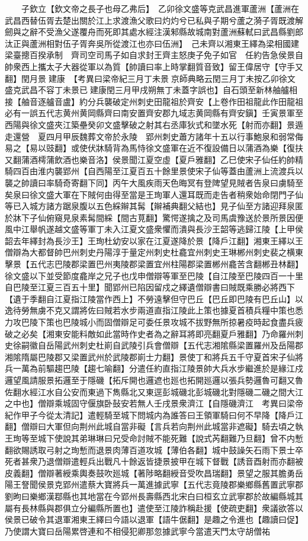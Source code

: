 　　子欽立【欽文帝之長子也母乙弗后】　乙卯徐文盛等克武昌進軍蘆洲【蘆洲在武昌西替伍胥去楚出關於江上求渡漁父歌曰灼灼兮已私與子期兮蘆之漪子胥既渡解劒與之辭不受漁父遂覆舟而死即其處水經注漢邾縣故城南對蘆洲蘇軾曰武昌縣劉郎汰正與蘆洲相對伍子胥奔吳所從渡江也亦曰伍洲】　己未齊以湘東王繹為梁相國建梁臺摠百揆承制　齊司空司馬子如自求封王齊主怒庚子免子如官　任約告急侯景自帥衆西上攜太子大器從軍以為質【帥讀曰率上時掌翻質音致】留王偉居守【守手又翻】閏月景建康　【考異曰梁帝紀三月丁未景京師典略云閏三月丁未按乙卯徐文盛克武昌不容丁未景已建康閏三月甲戌朔無丁未蓋字誤也】自石頭至新林舳艫相接【舳音逐艫音盧】約分兵襲破定州刺史田龍祖於齊安【上卷作田祖龍此作田龍祖必有一誤五代志黄州黄岡縣齊曰南安置齊安郡九域志黄岡縣有齊安鎭】壬寅景軍至西陽與徐文盛夾江築壘癸卯文盛擊破之射其右丞庫狄式和墜水死【射而亦翻】景遁走還營　夏四月甲辰魏葬文帝於永陵　郢州刺史蕭方諸年十五以行事鮑泉和弱常侮易之【易以豉翻】或使伏牀騎背為馬恃徐文盛軍在近不復設備日以蒲酒為樂【復扶又翻蒲酒樗蒲飲酒也樂音洛】侯景聞江夏空虛【夏戶雅翻】乙巳使宋子仙任約帥精騎四百由淮内襲郢州【自西陽至江夏百五十餘里景使宋子仙等蓋由蘆洲上流渡兵以襲之帥讀曰率騎奇寄翻下同】丙午大風疾雨天色晦冥有登陴望見賊者告泉曰虜騎至矣泉曰徐文盛大軍在下賊何由得至當是王珣軍人還耳既而走告者稍衆始命閉門子仙等已入城方諸方踞泉腹以五色綵辮其髯【辮補典翻父結也】見子仙至方諸迎拜泉匿於牀下子仙俯窺見泉素髯間綵【間古莧翻】驚愕遂擒之及司馬虞豫送於景所景因便風中江舉帆遂越文盛等軍丁未入江夏文盛衆懼而潰與長沙王韶等逃歸江陵【上甲侯韶去年繹封為長沙王】王珣杜幼安以家在江夏遂降於景【降戶江翻】湘東王繹以王僧辯為大都督帥巴州刺史丹陽淳于量定州刺史杜龕宜州刺史王琳郴州刺史裴之横東擊景【五代志巴陵郡梁置巴州夷陵郡梁置宜州柱陽郡梁置郴州龕苦含翻郴丑林翻】徐文盛以下並受節度龕岸之兄子也戊申僧辯等軍至巴陵【自江陵至巴陵四百一十里自巴陵至江夏三百五十里】聞郢州已陷因留戍之繹遺僧辯書曰賊既乘勝必將西下【遺于季翻自江夏指江陵當作西上】不勞遠擊但守巴丘【巴丘即巴陵有巴丘山】以逸待勞無虜不克又謂將佐曰賊若水步兩道直指江陵此上策也據夏首積兵糧中策也悉力攻巴陵下策也巴陵城小而固僧辯足可委任景攻城不拔野無所掠暑疫時起食盡兵疲破之必矣【湘東安能料敵如此當時作史者為之辭耳將即亮翻夏戶雅翻】乃命羅州刺史徐嗣徽自岳陽武州刺史杜崱自武陵引兵會僧辯【五代志湘隂縣梁置羅州及岳陽郡湘隂隋屬巴陵郡又梁置武州於武陵郡崱士力翻】景使丁和將兵五千守夏首宋子仙將兵一萬為前驅趨巴陵【趨七喻翻】分遣任約直指江陵景帥大兵水步繼進於是緣江戍邏望風請服景拓邏至于隱磯【拓斥開也邏遮也廵也拓開廵邏以張兵勢邏魯可翻又魯佐翻水經江水自公安而東過下雋縣北又東逕彭城磯北彭城磯北對隱磯二磯之間大江之中也】僧辯乘城固守偃旗卧鼔安若無人壬戌景衆濟江【自隱磯濟江　考異曰梁帝紀作甲子今從太清記】遣輕騎至城下問城内為誰答曰王領軍騎曰何不早降【降戶江翻】僧辯曰大軍但向荆州此城自當非礙【言兵若向荆州此城當非遮礙】騎去頃之執王珣等至城下使說其弟琳琳曰兄受命討賊不能死難【說式芮翻難乃旦翻】曾不内慙翻欲賜誘取弓射之珣慙而退景肉薄百道攻城【薄伯各翻】城中鼓譟矢石雨下景士卒死者甚衆乃退僧辯遣輕兵出戰凡十餘返皆捷景披甲在城下督戰【誘音酉射而亦翻被皮義翻】僧辯著綬乘輿奏鼓吹廵城【著陟略翻綬音受吹昌瑞翻】景望之服其膽勇岳陽王詧聞侯景克郢州遣蔡大寶將兵一萬進據武寧【五代志竟陵郡樂鄉縣舊置武寧郡劉昫曰樂鄉漢鄀縣也其地當在今郢州長壽縣西北宋白曰桓玄立武寧郡於故編縣城其屬有長林縣與郡俱立分編縣所置也】遣使至江陵詐稱赴援【使疏吏翻】衆議欲答以侯景已破令其退軍湘東王繹曰今語以退軍【語牛倨翻】是趣之令進也【趣讀曰促】乃使謂大寶曰岳陽累啓連和不相侵犯卿那忽據武寧今當遣天門太守胡僧祐